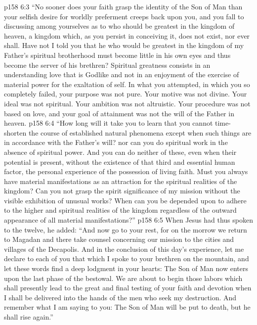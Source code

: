 \vs p158 6:3 \textcolor{ubdarkred}{“No sooner does your faith grasp the identity of the Son of Man than your selfish desire for worldly preferment creeps back upon you, and you fall to discussing among yourselves as to who should be greatest in the kingdom of heaven, a kingdom which, as you persist in conceiving it, does not exist, nor ever shall. Have not I told you that he who would be greatest in the kingdom of my Father’s spiritual brotherhood must become little in his own eyes and thus become the server of his brethren? Spiritual greatness consists in an understanding love that is Godlike and not in an enjoyment of the exercise of material power for the exaltation of self. In what you attempted, in which you so completely failed, your purpose was not pure. Your motive was not divine. Your ideal was not spiritual. Your ambition was not altruistic. Your procedure was not based on love, and your goal of attainment was not the will of the Father in heaven.}\plusone
\vs p158 6:4 \textcolor{ubdarkred}{“How long will it take you to learn that you cannot time\hyp{}shorten the course of established natural phenomena except when such things are in accordance with the Father’s will? nor can you do spiritual work in the absence of spiritual power. And you can do neither of these, even when their potential is present, without the existence of that third and essential human factor, the personal experience of the possession of living faith. Must you always have material manifestations as an attraction for the spiritual realities of the kingdom? Can you not grasp the spirit significance of my mission without the visible exhibition of unusual works? When can you be depended upon to adhere to the higher and spiritual realities of the kingdom regardless of the outward appearance of all material manifestations?”}
\vs p158 6:5 When Jesus had thus spoken to the twelve, he added: \textcolor{ubdarkred}{“And now go to your rest, for on the morrow we return to Magadan and there take counsel concerning our mission to the cities and villages of the Decapolis. And in the conclusion of this day’s experience, let me declare to each of you that which I spoke to your brethren on the mountain, and let these words find a deep lodgment in your hearts: The Son of Man now enters upon the last phase of the bestowal. We are about to begin those labors which shall presently lead to the great and final testing of your faith and devotion when I shall be delivered into the hands of the men who seek my destruction. And remember what I am saying to you: The Son of Man will be put to death, but he shall rise again.”}
